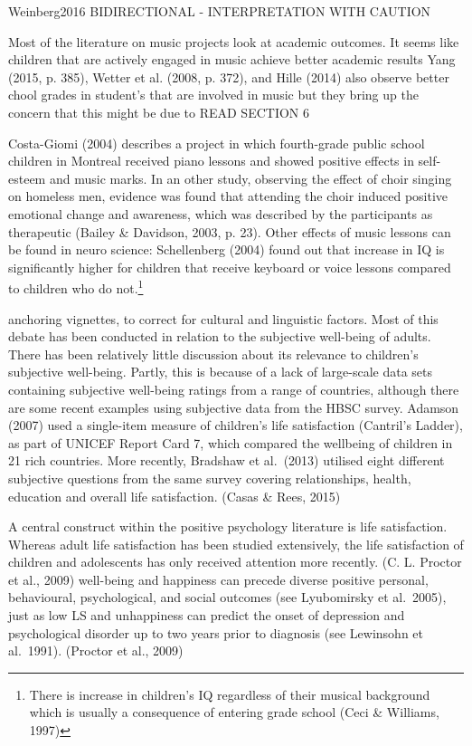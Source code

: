 \documentclass[a4, 12pt]{article}
\let\rmarkdownfootnote\footnote%
\def\footnote{\protect\rmarkdownfootnote}
\begin{document}
Weinberg2016 BIDIRECTIONAL - INTERPRETATION WITH CAUTION

Most of the literature on music projects look at academic outcomes. It seems like children that are actively engaged in music achieve better academic results Yang (2015, p. 385), Wetter et al. (2008, p. 372), and Hille (2014) also observe better chool grades in student's that are involved in music but they bring up the concern that this might be due to READ SECTION 6

Costa-Giomi (2004) describes a project in which fourth-grade public school children in Montreal received piano lessons and showed positive effects in self-esteem and music marks.
In an other study, observing the effect of choir singing on homeless men, evidence was found that attending the choir induced positive emotional change and awareness, which was described by the participants as therapeutic (Bailey \& Davidson, 2003, p. 23). Other effects of music lessons can be found in neuro science: Schellenberg (2004) found out that increase in IQ is significantly higher for children that receive keyboard or voice lessons compared to children who do not.\footnote{There is increase in children's IQ regardless of their musical background which is usually a consequence of entering grade school (Ceci \& Williams, 1997)}

anchoring vignettes, to correct for cultural and linguistic factors.
Most of this debate has been conducted in relation to the subjective well-being
of adults. There has been relatively little discussion about its relevance to
children's subjective well-being. Partly, this is because of a lack of large-scale
data sets containing subjective well-being ratings from a range of countries,
although there are some recent examples using subjective data from the HBSC
survey. Adamson (2007) used a single-item measure of children's life satisfaction
(Cantril's Ladder), as part of UNICEF Report Card 7, which compared the wellbeing
of children in 21 rich countries. More recently, Bradshaw et al.~(2013)
utilised eight different subjective questions from the same survey covering
relationships, health, education and overall life satisfaction. (Casas \& Rees, 2015)

A central construct within the positive psychology literature is life satisfaction.
Whereas adult life satisfaction has been studied extensively, the life satisfaction of children
and adolescents has only received attention more recently. (C. L. Proctor et al., 2009)
well-being and happiness can precede diverse positive
personal, behavioural, psychological, and social outcomes (see Lyubomirsky et al.~2005),
just as low LS and unhappiness can predict the onset of depression and psychological
disorder up to two years prior to diagnosis (see Lewinsohn et al.~1991). (Proctor et al., 2009)
\end{document}
